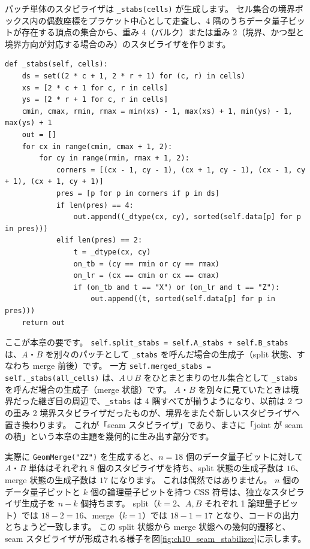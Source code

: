 パッチ単体のスタビライザは \texttt{\_stabs(cells)} が生成します。
セル集合の境界ボックス内の偶数座標をプラケット中心として走査し、4 隅のうちデータ量子ビットが存在する頂点の集合から、重み 4（バルク）または重み 2（境界、かつ型と境界方向が対応する場合のみ）のスタビライザを作ります。

\begin{lstlisting}[caption={パッチのスタビライザ生成（src/stages/01\_mpp/src/ftqc/geom\_lattice\_surgery.py）}]
def _stabs(self, cells):
    ds = set((2 * c + 1, 2 * r + 1) for (c, r) in cells)
    xs = [2 * c + 1 for c, r in cells]
    ys = [2 * r + 1 for c, r in cells]
    cmin, cmax, rmin, rmax = min(xs) - 1, max(xs) + 1, min(ys) - 1, max(ys) + 1
    out = []
    for cx in range(cmin, cmax + 1, 2):
        for cy in range(rmin, rmax + 1, 2):
            corners = [(cx - 1, cy - 1), (cx + 1, cy - 1), (cx - 1, cy + 1), (cx + 1, cy + 1)]
            pres = [p for p in corners if p in ds]
            if len(pres) == 4:
                out.append((_dtype(cx, cy), sorted(self.data[p] for p in pres)))
            elif len(pres) == 2:
                t = _dtype(cx, cy)
                on_tb = (cy == rmin or cy == rmax)
                on_lr = (cx == cmin or cx == cmax)
                if (on_tb and t == "X") or (on_lr and t == "Z"):
                    out.append((t, sorted(self.data[p] for p in pres)))
    return out
\end{lstlisting}

ここが本章の要です。
\texttt{self.split\_stabs = self.A\_stabs + self.B\_stabs} は、$A$・$B$ を別々のパッチとして \texttt{\_stabs} を呼んだ場合の生成子（split 状態、すなわち merge 前後）です。
一方 \texttt{self.merged\_stabs = self.\_stabs(all\_cells)} は、$A\cup B$ をひとまとまりのセル集合として \texttt{\_stabs} を呼んだ場合の生成子（merge 状態）です。
$A$・$B$ を別々に見ていたときは境界だった継ぎ目の周辺で、\texttt{\_stabs} は 4 隅すべてが揃うようになり、以前は 2 つの重み 2 境界スタビライザだったものが、境界をまたぐ新しいスタビライザへ置き換わります。
これが「seam スタビライザ」であり、まさに「joint が seam の積」という本章の主題を幾何的に生み出す部分です。

実際に \texttt{GeomMerge("ZZ")} を生成すると、$n=18$ 個のデータ量子ビットに対して $A$・$B$ 単体はそれぞれ 8 個のスタビライザを持ち、split 状態の生成子数は $16$、merge 状態の生成子数は $17$ になります。
これは偶然ではありません。
$n$ 個のデータ量子ビットと $k$ 個の論理量子ビットを持つ CSS 符号は、独立なスタビライザ生成子を $n-k$ 個持ちます。
split（$k=2$、$A,B$ それぞれ 1 論理量子ビット）では $18-2=16$、merge（$k=1$）では $18-1=17$ となり、コードの出力とちょうど一致します。
この split 状態から merge 状態への幾何的遷移と、seam スタビライザが形成される様子を図\ref{fig:ch10_seam_stabilizer}に示します。

